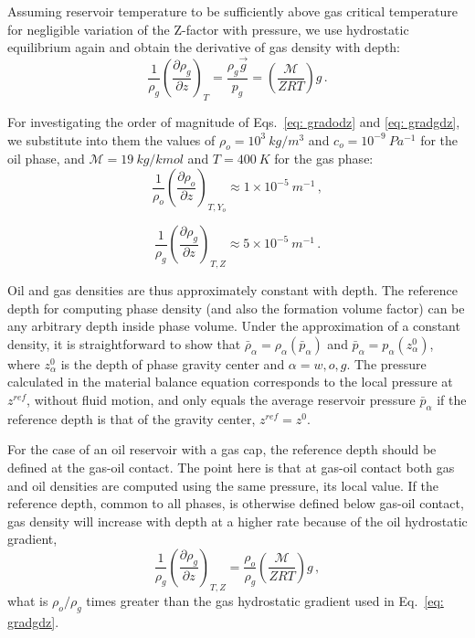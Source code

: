 \documentclass[authoryear,preprint,review,11pt]{elsarticle}
\begin{document}
Assuming reservoir temperature to be sufficiently above gas critical temperature for negligible variation of the Z-factor with pressure, we use hydrostatic equilibrium again and obtain the derivative of gas density with depth:
\begin{equation}\label{eq: gradgdz}
\frac{1}{\rho_g}\left(\frac{\partial \rho_g}{\partial z}\right)_{T} = \frac{\rho_g \vec{g}}{p_g} = \left(\frac{\mathcal{M}}{ Z R T}\right) g \, .
\end{equation}

For investigating the order of magnitude of Eqs.~\eqref{eq: gradodz} and \eqref{eq: gradgdz}, we substitute into them the values of $\rho_o = 10^3\ kg/m^3$ and $c_o = 10^{-9}\ Pa^{-1}$ for the oil phase, and $\mathcal{M}=19\ kg/kmol$ and $T=400\ K$ for the gas phase: 
\begin{equation}
\frac{1}{\rho_o}\left(\frac{\partial \rho_o}{\partial z}\right)_{T,Y_o} \approx 1\times10^{-5}\ m^{-1} \, ,
\end{equation}

\begin{equation}
\frac{1}{\rho_g}\left(\frac{\partial \rho_g}{\partial z}\right)_{T,Z} \approx 5\times10^{-5}\ m^{-1} \, .
\end{equation}

Oil and gas densities are thus approximately constant with depth.
The reference depth for computing phase density (and also the formation volume factor) can be any arbitrary depth inside phase volume. Under the approximation of a constant density, it is straightforward to show that $\bar{\rho}_\alpha = \rho_\alpha\left(\bar{p}_\alpha\right)$ and $\bar{p}_\alpha=p_\alpha\left(z^0_\alpha\right)$, where $z^0_\alpha$ is the depth of phase gravity center and $\alpha=w, o, g$. The pressure calculated in the material balance equation corresponds to the local pressure at $z^{ref}$, without fluid motion, and only equals the average reservoir pressure $\bar{p}_\alpha$ if the reference depth is that of the gravity center, $z^{ref}=z^0$.

For the case of an oil reservoir with a gas cap, the reference depth should be defined at the gas-oil contact. The point here is that at gas-oil contact both gas and oil densities are computed using the same pressure, its local value. If the reference depth, common to all phases, is otherwise defined below gas-oil contact, gas density will increase with depth at a higher rate because of the oil hydrostatic gradient,
\begin{equation}
\frac{1}{\rho_g}\left(\frac{\partial \rho_g}{\partial z}\right)_{T,Z} = \frac{\rho_o}{\rho_g}\left(\frac{\mathcal{M}}{Z R T}\right)g  \, ,
\end{equation}
what is $\rho_o / \rho_g$ times greater than the gas hydrostatic gradient used in Eq.~\eqref{eq: gradgdz}.
\end{document}
